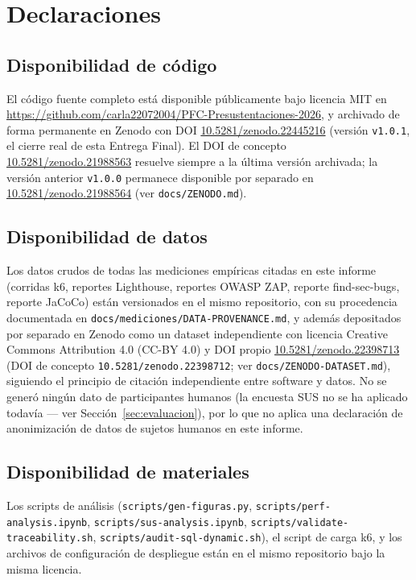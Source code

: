 \section*{Declaraciones}

\subsection*{Disponibilidad de código}
El código fuente completo está disponible públicamente bajo licencia MIT en
\url{https://github.com/carla22072004/PFC-Presustentaciones-2026}, y archivado de forma permanente
en Zenodo con DOI \href{https://doi.org/10.5281/zenodo.22445216}{10.5281/zenodo.22445216} (versión
\texttt{v1.0.1}, el cierre real de esta Entrega Final). El DOI de concepto
\href{https://doi.org/10.5281/zenodo.21988563}{10.5281/zenodo.21988563} resuelve siempre a la
última versión archivada; la versión anterior \texttt{v1.0.0} permanece disponible por separado en
\href{https://doi.org/10.5281/zenodo.21988564}{10.5281/zenodo.21988564} (ver \texttt{docs/ZENODO.md}).

\subsection*{Disponibilidad de datos}
Los datos crudos de todas las mediciones empíricas citadas en este informe (corridas k6, reportes
Lighthouse, reportes OWASP ZAP, reporte find-sec-bugs, reporte JaCoCo) están versionados en el mismo
repositorio, con su procedencia documentada en \texttt{docs/mediciones/DATA-PROVENANCE.md}, y además
depositados por separado en Zenodo como un dataset independiente con licencia Creative Commons
Attribution 4.0 (CC-BY 4.0) y DOI propio
\href{https://doi.org/10.5281/zenodo.22398713}{10.5281/zenodo.22398713} (DOI de concepto
\texttt{10.5281/zenodo.22398712}; ver \texttt{docs/ZENODO-DATASET.md}), siguiendo el principio de
citación independiente entre software y datos. No se generó ningún dato de participantes humanos
(la encuesta SUS no se ha aplicado todavía --- ver Sección~\ref{sec:evaluacion}), por lo que no
aplica una declaración de anonimización de datos de sujetos humanos en este informe.

\subsection*{Disponibilidad de materiales}
Los scripts de análisis (\texttt{scripts/gen-figuras.py}, \texttt{scripts/perf-analysis.ipynb},
\texttt{scripts/sus-analysis.ipynb}, \texttt{scripts/validate-traceability.sh},
\texttt{scripts/audit-sql-dynamic.sh}), el script de carga k6, y los archivos de configuración de
despliegue están en el mismo repositorio bajo la misma licencia.

